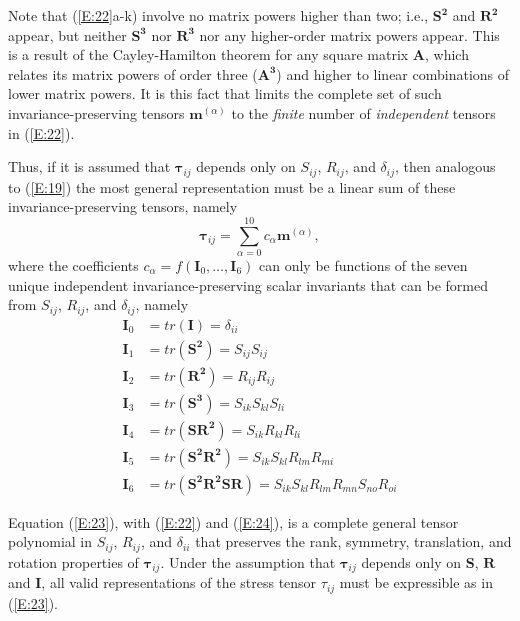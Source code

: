 %
%      
	  	
Note that (\ref{E:22}a-k) involve no matrix powers higher than two; i.e., $\mathbf{S^2}$ and $\mathbf{R^2}$  appear, but neither $\mathbf{S^3}$  nor $\mathbf{R^3}$  nor any higher-order matrix powers appear. This is a result of the Cayley-Hamilton theorem for any square matrix $\mathbf{A}$, which relates its matrix powers of order three ($\mathbf{A^3}$) and higher to linear combinations of lower matrix powers. It is this fact that limits the complete set of such invariance-preserving tensors  $\mathbf{m}^{(\alpha)}$  to the \textit{finite} number of \textit{independent} tensors in (\ref{E:22}).

Thus, if it is assumed that $\mathbf{\tau}_{ij}$  depends only on $S_{ij}$, $R_{ij}$, and $\delta_{ij}$, then analogous to (\ref{E:19}) the most general representation must be a linear sum of these invariance-preserving tensors, namely
%
\begin{equation}
\label{E:23}
	\mathbf{\tau}_{ij} = \sum_{\alpha=0}^{10} c_{\alpha} \mathbf{m}^{(\alpha)},
\end{equation}
%
%   
where the coefficients $c_{\alpha} = f(\mathbf{I}_0, \ldots, \mathbf{I}_6)$  can only be functions of the seven unique independent invariance-preserving scalar invariants that can be formed from $S_{ij}$, $R_{ij}$, and $\delta_{ij}$, namely
%
\begin{subequations}
\label{E:24}
\begin{align}
 	\mathbf{I}_{0} &= tr(\mathbf{I})   = \delta_{ii} \\
	\mathbf{I}_{1} &= tr(\mathbf{S^2}) = S_{ij}S_{ij} \\
	\mathbf{I}_{2} &= tr(\mathbf{R^2}) = R_{ij}R_{ij} \\
	\mathbf{I}_{3} &= tr(\mathbf{S^3}) = S_{ik}S_{kl}S_{li} \\
	\mathbf{I}_{4} &= tr(\mathbf{SR^2}) = S_{ik}R_{kl}R_{li} \\ 
	\mathbf{I}_{5} &= tr(\mathbf{S^2R^2}) = S_{ik}S_{kl}R_{lm}R_{mi} \\ 
	\mathbf{I}_{6} &= tr(\mathbf{S^2R^2SR}) = S_{ik}S_{kl}R_{lm}R_{mn}S_{no}R_{oi} 
\end{align}
\end{subequations}
%
%    

Equation (\ref{E:23}), with (\ref{E:22}) and (\ref{E:24}), is a complete general tensor polynomial in $S_{ij}$, $R_{ij}$, and $\delta_{ii}$ that preserves the rank, symmetry, translation, and rotation properties of $\mathbf{\tau}_{ij}$.  Under the assumption that $\mathbf{\tau}_{ij}$  depends only on $\mathbf{S}$, $\mathbf{R}$ and $\mathbf{I}$, all valid representations of the stress tensor $\tau_{ij}$  must be expressible as in (\ref{E:23}).

